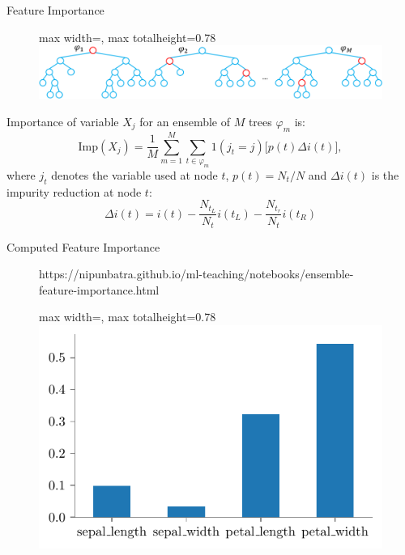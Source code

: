 \documentclass[8pt]{beamer}
\newcommand{\fitpic}[1]{\begin{adjustbox}{max width=\linewidth, max totalheight=0.78\textheight}#1\end{adjustbox}}
\begin{document}
\begin{frame}{Feature Importance\footnotemark}
  \begin{figure}
    \fitpic{\includegraphics[scale=0.4]{../assets/ensemble/diagrams/mdi.pdf}}
  \end{figure}
  Importance of variable $X_j$ for an ensemble of $M$ trees $\varphi_{m}$ is:
  \begin{equation*}
    \text{Imp}(X_j) = \frac{1}{M} \sum_{m=1}^M \sum_{t \in \varphi_{m}} 1(j_t = j) \Big[ p(t) \Delta i(t) \Big],
  \end{equation*}
  where $j_t$ denotes the variable used at node $t$, $p(t)=N_t/N$ and $\Delta i(t)$ is the impurity reduction at node $t$:
  \begin{equation*}
    \Delta i(t) = i(t) - \frac{N_{t_L}}{N_t} i(t_L) - \frac{N_{t_r}}{N_t} i(t_R)
  \end{equation*}

\end{frame}


\begin{frame}{Computed Feature Importance}
  \begin{figure}[htp]
    \centering
    \begin{notebookbox}{https://nipunbatra.github.io/ml-teaching/notebooks/ensemble-feature-importance.html}
      \fitpic{\includegraphics[scale=0.8]{../assets/ensemble/figures/feature-imp-forest.pdf}}
    \end{notebookbox}
\end{figure}
\end{frame}
\end{document}
